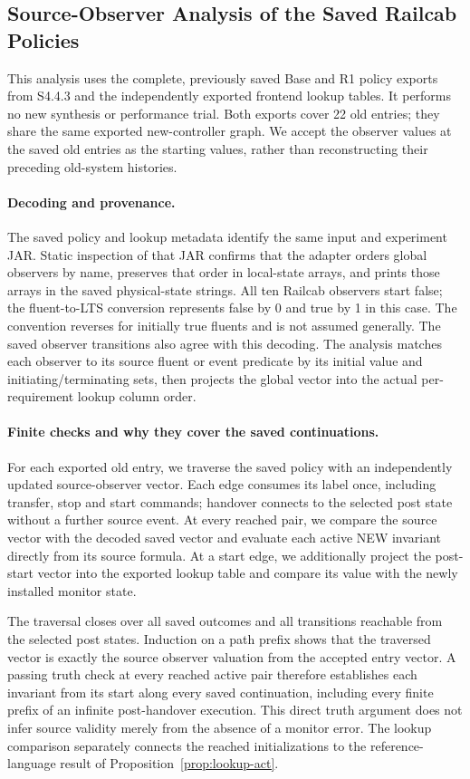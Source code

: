 \subsection{Source-Observer Analysis of the Saved Railcab Policies}
\label{ta:railcab-activation}
This analysis uses the complete, previously saved Base and R1 policy exports from S4.4.3 and the independently exported frontend lookup tables. It performs no new synthesis or performance trial. Both exports cover 22 old entries; they share the same exported new-controller graph. We accept the observer values at the saved old entries as the starting values, rather than reconstructing their preceding old-system histories.

\paragraph{Decoding and provenance.}
The saved policy and lookup metadata identify the same input and experiment JAR. Static inspection of that JAR confirms that the adapter orders global observers by name, preserves that order in local-state arrays, and prints those arrays in the saved physical-state strings. All ten Railcab observers start false; the fluent-to-LTS conversion represents false by 0 and true by 1 in this case. The convention reverses for initially true fluents and is not assumed generally. The saved observer transitions also agree with this decoding. The analysis matches each observer to its source fluent or event predicate by its initial value and initiating/terminating sets, then projects the global vector into the actual per-requirement lookup column order.

\paragraph{Finite checks and why they cover the saved continuations.}
For each exported old entry, we traverse the saved policy with an independently updated source-observer vector. Each edge consumes its label once, including transfer, stop and start commands; handover connects to the selected post state without a further source event. At every reached pair, we compare the source vector with the decoded saved vector and evaluate each active NEW invariant directly from its source formula. At a start edge, we additionally project the post-start vector into the exported lookup table and compare its value with the newly installed monitor state.

The traversal closes over all saved outcomes and all transitions reachable from the selected post states. Induction on a path prefix shows that the traversed vector is exactly the source observer valuation from the accepted entry vector. A passing truth check at every reached active pair therefore establishes each invariant from its start along every saved continuation, including every finite prefix of an infinite post-handover execution. This direct truth argument does not infer source validity merely from the absence of a monitor error. The lookup comparison separately connects the reached initializations to the reference-language result of Proposition~\ref{prop:lookup-act}.

